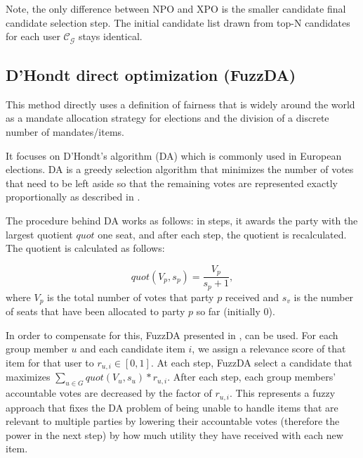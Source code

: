 Note, the only difference between NPO and XPO is the smaller candidate final candidate selection step. The initial candidate list drawn from top-N candidates for each user $\mathcal{C}_\mathcal{G}$ stays identical.


\subsection{D'Hondt direct optimization (FuzzDA)} \label{subsec:03_advanced_methods.DHondtDO}

This method directly uses a definition of fairness that is widely around the world as a mandate allocation strategy for elections and the division of a discrete number of mandates/items.

It focuses on D'Hondt's algorithm (DA) which is commonly used in European elections. DA is a greedy selection algorithm that minimizes the number of votes that need to be left aside so that the remaining votes are represented exactly proportionally as described in \cite{wiki:dhondt_method}.

The procedure behind DA works as follows: in steps, it awards the party with the largest quotient $quot$ one seat, and after each step, the quotient is recalculated. The quotient is calculated as follows:

\begin{equation}
    quot(V_p, s_p) = \dfrac{V_p}{s_p + 1},
\end{equation}
where $V_p$ is the total number of votes that party $p$ received and $s_v$ is the number of seats that have been allocated to party $p$ so far (initially 0).

In order to compensate for this, FuzzDA presented in \cite{fuzz_da}, can be used. For each group member $u$ and each candidate item $i$, we assign a relevance score of that item for that user to $r_{u,i} \in [0,1]$. At each step, FuzzDA select a candidate that maximizes $\sum_{u \in G} quot(V_u, s_u) * r_{u,i}$. After each step, each group members' accountable votes are decreased by the factor of $r_{u,i}$. This represents a fuzzy approach that fixes the DA problem of being unable to handle items that are relevant to multiple parties by lowering their accountable votes (therefore the power in the next step) by how much utility they have received with each new item.
